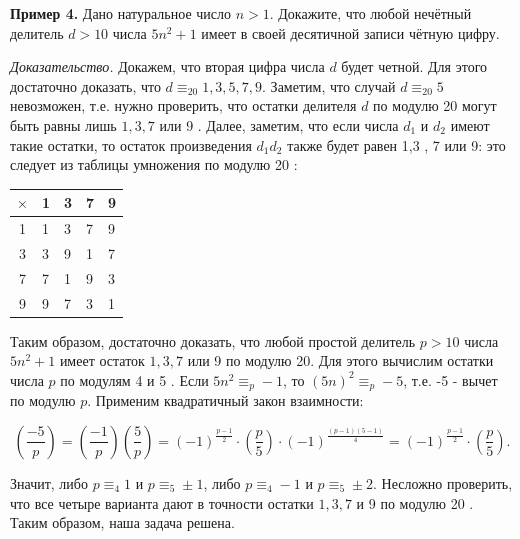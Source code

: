 \textbf{Пример 4.}
Дано натуральное число $n>1$. Докажите, что любой нечётный делитель $d>10$ числа $5 n^2+1$ имеет в своей десятичной записи чётную цифру.

\textit{Доказательство.} Докажем, что вторая цифра числа $d$ будет четной. Для этого достаточно доказать, что $d \equiv_{20} 1,3,5,7,9$. Заметим, что случай $d \equiv_{20} 5$ невозможен, т.е. нужно проверить, что остатки делителя $d$ по модулю 20 могут быть равны лишь $1,3,7$ или 9 . Далее, заметим, что если числа $d_1$ и $d_2$ имеют такие остатки, то остаток произведения $d_1 d_2$ также будет равен 1,3 , 7 или 9: это следует из таблицы умножения по модулю 20 :

\begin{tabular}{|c|l|l|l|l|}
\hline$\times$ & 1 & 3 & 7 & 9 \\
\hline 1 & 1 & 3 & 7 & 9 \\
\hline 3 & 3 & 9 & 1 & 7 \\
\hline 7 & 7 & 1 & 9 & 3 \\
\hline 9 & 9 & 7 & 3 & 1 \\
\hline
\end{tabular}

Таким образом, достаточно доказать, что любой простой делитель $p>10$ числа $5 n^2+1$ имеет остаток $1,3,7$ или 9 по модулю 20. Для этого вычислим остатки числа $p$ по модулям 4 и 5 . Если $5 n^2 \equiv_p-1$, то $(5 n)^2 \equiv_p-5$, т.е. -5 - вычет по модулю $p$. Применим квадратичный закон взаимности:

$$
\left(\frac{-5}{p}\right)=\left(\frac{-1}{p}\right)\left(\frac{5}{p}\right)=(-1)^{\frac{p-1}{2}} \cdot\left(\frac{p}{5}\right) \cdot(-1)^{\frac{(p-1)(5-1)}{4}}=(-1)^{\frac{p-1}{2}} \cdot\left(\frac{p}{5}\right) .
$$


Значит, либо $p \equiv_4 1$ и $p \equiv_5 \pm 1$, либо $p \equiv_4-1$ и $p \equiv_5 \pm 2$. Несложно проверить, что все четыре варианта дают в точности остатки $1,3,7$ и 9 по модулю 20 . Таким образом, наша задача решена.